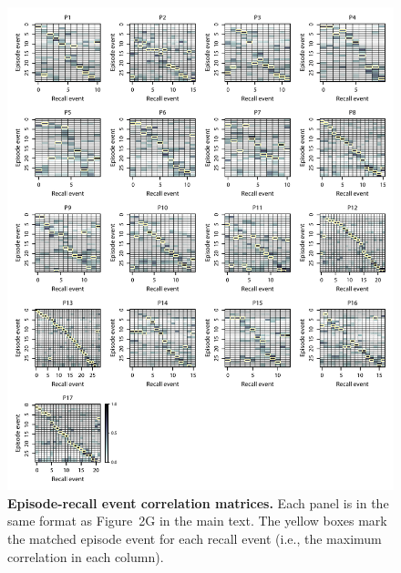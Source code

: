 \documentclass{article}
\newcommand{\topicprops}{2}
\begin{document}
\begin{figure}[p!]
\centering
\includegraphics[width=\textwidth]{figs/matchmats}
\caption{\small \textbf{Episode-recall event correlation matrices.}  Each panel is in the same format as Figure~\topicprops G in the main text.  The yellow boxes mark the matched episode event for each recall event (i.e., the maximum correlation in each column).}
\label{fig:matchmats}
\end{figure}
\end{document}
